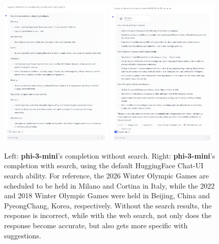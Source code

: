 \documentclass[11pt]{article}
\begin{document}
\begin{figure}
    \centering
    \includegraphics[width=0.48\textwidth]{without_search.png}    \includegraphics[width=0.48\textwidth]{with_search.png}
    \caption{Left: \textbf{phi-3-mini}'s completion without search. Right: \textbf{phi-3-mini}'s completion with search, using the default HuggingFace Chat-UI search ability. For reference, the 2026 Winter Olympic Games are scheduled to be held in Milano and Cortina in Italy, while the 2022 and 2018 Winter Olympic Games were held in Beijing, China and PyeongChang, Korea, respectively. Without the search results, the response is incorrect, while with the web search, not only does the response become accurate, but also gets more specific with suggestions.}
    \label{fig:search}
\end{figure}
\end{document}
